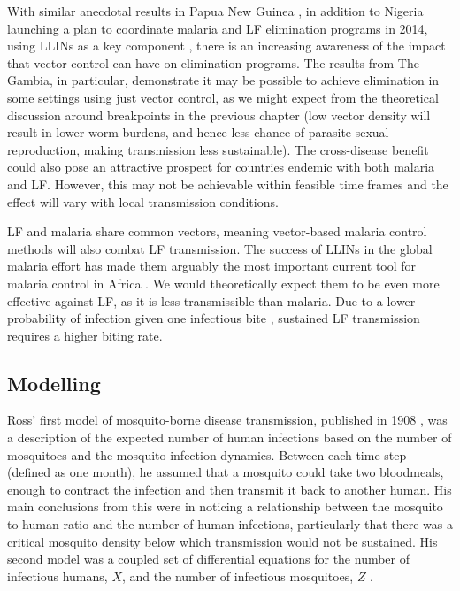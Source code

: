 With similar anecdotal results in Papua New Guinea \cite{Reimer2013_insecticidal}, in addition to Nigeria launching a plan to coordinate malaria and LF elimination programs in 2014, using LLINs as a key component \cite{Nigeria,richards2013}, there is an increasing awareness of the impact that vector control can have on elimination programs. The results from The Gambia, in particular, demonstrate it may be possible to achieve elimination in some settings using just vector control, as we might expect from the theoretical discussion around breakpoints in the previous chapter (low vector density will result in lower worm burdens, and hence less chance of parasite sexual reproduction, making transmission less sustainable). The cross-disease benefit could also pose an attractive prospect for countries endemic with both malaria and LF. However, this may not be achievable within feasible time frames and the effect will vary with local transmission conditions.

LF and malaria share common vectors, meaning vector-based malaria control methods will also combat LF transmission. The success of LLINs in the global malaria effort has made them arguably the most important current tool for malaria control in Africa \cite{killeen2007}. We would theoretically expect them to be even more effective against LF, as it is less transmissible than malaria. Due to a lower probability of infection given one infectious bite \cite{bogh1998}, sustained LF transmission requires a higher biting rate.

\subsection{Modelling}

Ross' first model of mosquito-borne disease transmission, published in 1908 \cite{Ross1908}, was a description of the expected number of human infections based on the number of mosquitoes and the mosquito infection dynamics. Between each time step (defined as one month), he assumed that a mosquito could take two bloodmeals, enough to contract the infection and then transmit it back to another human. His main conclusions from this were in noticing a relationship between the mosquito to human ratio and the number of human infections, particularly that there was a critical mosquito density below which transmission would not be sustained. His second model was a coupled set of differential equations for the number of infectious humans, $X$, and the number of infectious mosquitoes, $Z$ \cite{Ross1911}.

